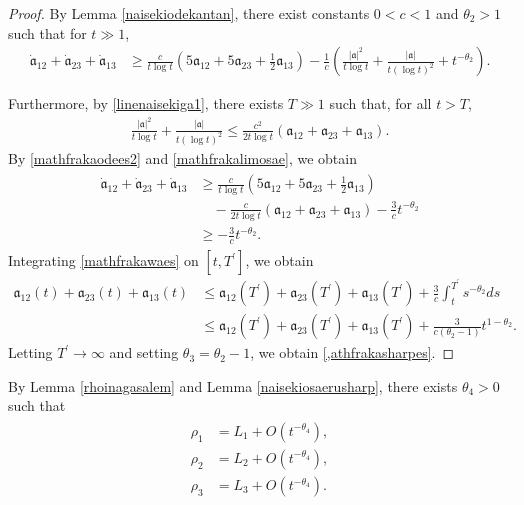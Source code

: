 \documentclass[reqno]{amsart}
\theoremstyle{plain}
\theoremstyle{definition}
\numberwithin{equation}{section}
\begin{document}
\begin{proof}
By Lemma \ref{naisekiodekantan}, there exist constants $0<c<1$ and $\theta_2>1$ such that for $t\gg 1$,
\begin{align}\label{mathfrakaodees2}
\dot{\mathfrak{a}}_{12}+\dot{\mathfrak{a}}_{23}+\dot{\mathfrak{a}}_{13}&\geq  \frac{c}{t\log{t}}\left(5\mathfrak{a}_{12}+5\mathfrak{a}_{23}+\frac{1}{2}\mathfrak{a}_{13}\right)-\frac{1}{c}\left(\frac{|\mathfrak{a}|^2}{t\log{t}}+\frac{|\mathfrak{a}|}{t(\log{t})^2}+t^{-\theta_2}\right).
\end{align}

Furthermore, by \eqref{linenaisekiga1}, there exists $T\gg 1$ such that, for all $t>T$,
\begin{align}\label{mathfrakalimosae}
\frac{|\mathfrak{a}|^2}{t\log{t}}+\frac{|\mathfrak{a}|}{t(\log{t})^2}\leq \frac{c^2}{2t\log{t}}\left(\mathfrak{a}_{12}+\mathfrak{a}_{23}+\mathfrak{a}_{13}\right).
\end{align}
By \eqref{mathfrakaodees2} and \eqref{mathfrakalimosae}, we obtain
\begin{align}\label{mathfrakawaes}
\begin{aligned}
\dot{\mathfrak{a}}_{12}+\dot{\mathfrak{a}}_{23}+\dot{\mathfrak{a}}_{13}&\geq  \frac{c}{t\log{t}}\left(5\mathfrak{a}_{12}+5\mathfrak{a}_{23}+\frac{1}{2}\mathfrak{a}_{13}\right)
\\
&\quad-\frac{c}{2t\log{t}}\left(\mathfrak{a}_{12}+\mathfrak{a}_{23}+\mathfrak{a}_{13}\right)-\frac{3}{c}t^{-\theta_2}
\\
&\geq -\frac{3}{c}t^{-\theta_2}.
\end{aligned}
\end{align}
Integrating \eqref{mathfrakawaes} on $[t,T^{\prime}]$, we obtain
\begin{align*}
\mathfrak{a}_{12}(t)+\mathfrak{a}_{23}(t)+\mathfrak{a}_{13}(t)&\leq \mathfrak{a}_{12}(T^{\prime})+\mathfrak{a}_{23}(T^{\prime})+\mathfrak{a}_{13}(T^{\prime})+\frac{3}{c}\int_t^{T^{\prime}}s^{-\theta_2}ds
\\
&\leq \mathfrak{a}_{12}(T^{\prime})+\mathfrak{a}_{23}(T^{\prime})+\mathfrak{a}_{13}(T^{\prime})+\frac{3}{c\left(\theta_2-1\right)}t^{1-\theta_2}.
\end{align*}
Letting $T^{\prime}\to\infty$ and setting $\theta_3=\theta_2-1$, we obtain \eqref{,athfrakasharpes}.


\end{proof}




By Lemma \ref{rhoinagasalem} and Lemma \ref{naisekiosaerusharp}, there exists $\theta_4>0$ such that 
\begin{align}\label{rhokaizen}
\begin{aligned}
\rho_1&=L_1+O\left(t^{-\theta_4}\right),
\\
\rho_2&=L_2+O\left(t^{-\theta_4}\right),
\\
\rho_3&=L_3+O\left(t^{-\theta_4}\right).
\end{aligned}
\end{align}
\end{document}
